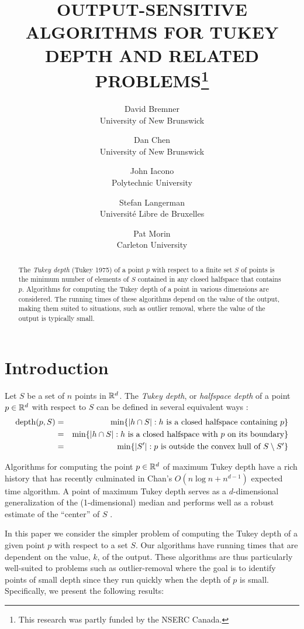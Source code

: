 \documentclass[charterfonts,lotsofwhite]{patmorin}
\title{\MakeUppercase{Output-Sensitive Algorithms for Tukey Depth and
        Related Problems}\thanks{This research was partly funded by
	the NSERC Canada.}}
\author{David Bremner \\ University of New Brunswick \and
        Dan Chen \\ University of New Brunswick \and
	John Iacono \\ Polytechnic University \and
	Stefan Langerman \\ Universit\'e Libre de Bruxelles \and
	Pat Morin \\ Carleton University}
\date{}
\DeclareMathOperator{\td}{depth}
\begin{document}
\maketitle

\begin{abstract}
The \emph{Tukey depth} (Tukey 1975) of a point $p$ with respect to a
finite set $S$ of points is the minimum number of elements of $S$
contained in any closed halfspace that contains $p$.  Algorithms for
computing the Tukey depth of a point in various dimensions are
considered. The running times of these algorithms depend on the value
of the output, making them suited to situations, such as outlier
removal, where the value of the output is typically small.
\end{abstract}

\section{Introduction}

Let $S$ be a set of $n$ points in $\mathbb{R}^d$.
The \emph{Tukey depth}, or \emph{halfspace depth} of a point $p\in\mathbb{R}^d$ with
respect to $S$ can be defined in several equivalent ways \cite{t75}:
\begin{eqnarray}
\td(p,S) & = & \min\{ |h\cap S| :
	             \mbox{$h$ is a closed halfspace containing $p$} \} 
                       \eqlabel{tuk-orig} \\ 
            & = & \min\{ |h\cap S| :
                      \mbox{$h$ is a closed halfspace 
                            with $p$ on its boundary} \} 
                        \eqlabel{tuk-boundary} \\ 
            & = & \min\{ |S'| :
                      \mbox{$p$ is outside the convex hull of 
                           $S\setminus S'$} \}
                      \eqlabel{tuk-hull}
\end{eqnarray}

Algorithms for computing the point $p\in\mathbb{R}^d$ of maximum Tukey depth have a
rich history \cite{m91,ls03,c04} that has recently culminated in
Chan's $O(n\log n + n^{d-1})$ expected time algorithm.  A point of
maximum Tukey depth serves as a $d$-dimensional generalization of the
(1-dimensional) median and performs well as a robust estimate of the
``center'' of $S$ \cite{rr98,rr96,s90}.

In this paper we consider the simpler problem of computing the Tukey
depth of a given point $p$ with respect to a set $S$.  Our algorithms
have running times that are dependent on the value, $k$, of the
output.  These algorithms are thus particularly well-suited to
problems such as outlier-removal where the goal is to identify points
of small depth since they run quickly when the depth of $p$ is small.  
Specifically, we present the following results:
\end{document}
